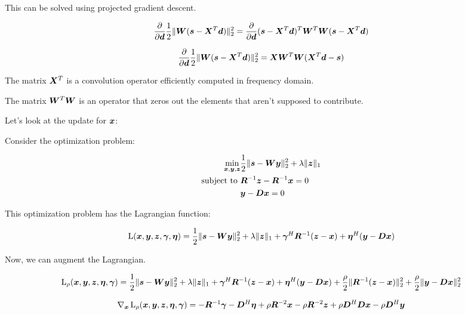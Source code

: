\documentclass{article}
\begin{document}
This can be solved using projected gradient descent.

\begin{equation}
\frac{ \partial}{\partial \bm{d}} \frac{1}{2}\|\bm{W}(\bm{s} - \bm{X}^T\bm{d})\|_2^2 = \frac{\partial}{\partial \bm{d}} (\bm{s} - \bm{X}^T\bm{d})^T\bm{W}^T\bm{W}(\bm{s} - \bm{X}^T\bm{d})
\end{equation}

\begin{equation}
\frac{ \partial}{\partial \bm{d}} \frac{1}{2}\|\bm{W}(\bm{s} - \bm{X}^T\bm{d})\|_2^2 = \bm{X}\bm{W}^T\bm{W}(\bm{X}^T\bm{d} - \bm{s})
\end{equation}

The matrix $\bm{X}^T$ is a convolution operator efficiently computed in frequency domain.

The matrix $\bm{W}^T\bm{W}$ is an operator that zeros out the elements that aren't supposed to contribute.


Let's look at the update for $\bm{x}$:

Consider the optimization problem:

\begin{equation}
\begin{aligned}
\min_{\bm{x},\bm{y},\bm{z}} & \frac{1}{2}\|\bm{s} - \bm{W}\bm{y}\|_2^2 + \lambda\|\bm{z}\|_1 \\
\text{subject to } & \bm{R}^{-1}\bm{z} - \bm{R}^{-1}\bm{x} = 0 \\
                   & \bm{y} -\bm{D}\bm{x} = 0
\end{aligned}
\end{equation}

This optimization problem has the Lagrangian function:

\begin{equation}
\operatorname{L}(\bm{x},\bm{y},\bm{z},\bm{\gamma},\bm{\eta}) = \frac{1}{2}\|\bm{s} - \bm{W}\bm{y}\|_2^2 + \lambda\|\bm{z}\|_1 + \bm{\gamma}^H\bm{R}^{-1}(\bm{z} - \bm{x}) + \bm{\eta}^H(\bm{y} - \bm{D}\bm{x})
\end{equation}

Now, we can augment the Lagrangian.

\begin{equation}
\operatorname{L}_{\rho}(\bm{x},\bm{y},\bm{z},\bm{\eta},\bm{\gamma}) = \frac{1}{2}\|\bm{s} - \bm{W}\bm{y}\|_2^2 + \lambda\|\bm{z}\|_1 + \bm{\gamma}^H\bm{R}^{-1}(\bm{z} - \bm{x}) + \bm{\eta}^H(\bm{y} - \bm{D}\bm{x}) + \frac{\rho}{2}\|\bm{R}^{-1}(\bm{z} - \bm{x})\|_2^2 + \frac{\rho}{2}\|\bm{y} - \bm{D}\bm{x}\|_2^2
\end{equation}

\begin{equation}
\nabla_{\bm{x}}\operatorname{L}_{\rho}(\bm{x},\bm{y},\bm{z},\bm{\eta},\bm{\gamma}) = -\bm{R}^{-1}\bm{\gamma} - \bm{D}^H\bm{\eta} + \rho\bm{R}^{-2}\bm{x} - \rho\bm{R}^{-2}\bm{z} + \rho\bm{D}^H\bm{D}\bm{x} - \rho\bm{D}^H\bm{y}
\end{equation}
\end{document}
